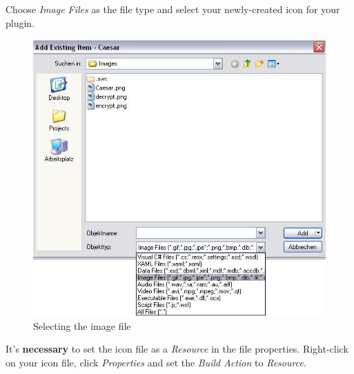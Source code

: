Choose \textit{Image Files} as the file type and select your newly-created icon for your plugin.

\begin{figure}[h!]
	\centering
		\includegraphics{figures/choose_icon.jpg}
	\caption{Selecting the image file}
	\label{fig:choose_icon}
\end{figure}
\clearpage

It's \textbf{necessary} to set the icon file as a \textit{Resource} in the file properties. Right-click on your icon file, click \textit{Properties} and set the \textit{Build Action} to \textit{Resource}.

